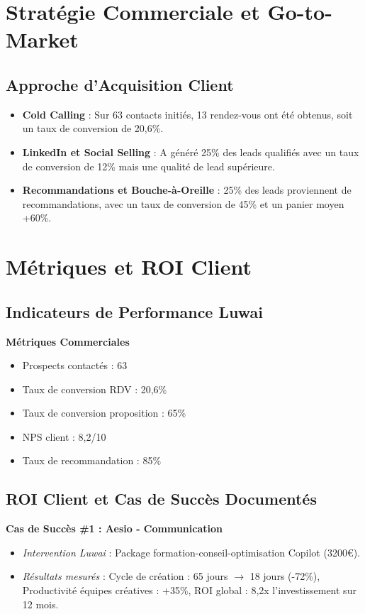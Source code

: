 \section{Stratégie Commerciale et Go-to-Market}

\subsection{Approche d'Acquisition Client}

\begin{itemize}
    \item \textbf{Cold Calling} : Sur 63 contacts initiés, 13 rendez-vous ont été obtenus, soit un taux de conversion de 20,6\%.
    \item \textbf{LinkedIn et Social Selling} : A généré 25\% des leads qualifiés avec un taux de conversion de 12\% mais une qualité de lead supérieure.
    \item \textbf{Recommandations et Bouche-à-Oreille} : 25\% des leads proviennent de recommandations, avec un taux de conversion de 45\% et un panier moyen +60\%.
\end{itemize}

\section{Métriques et ROI Client}

\subsection{Indicateurs de Performance Luwai}

\textbf{Métriques Commerciales}
\begin{itemize}
    \item Prospects contactés : 63
    \item Taux de conversion RDV : 20,6\%
    \item Taux de conversion proposition : 65\%
    \item NPS client : 8,2/10
    \item Taux de recommandation : 85\%
\end{itemize}

\subsection{ROI Client et Cas de Succès Documentés}

\textbf{Cas de Succès \#1 : Aesio - Communication}
\begin{itemize}
    \item \emph{Intervention Luwai} : Package formation-conseil-optimisation Copilot (3200€).
    \item \emph{Résultats mesurés} : Cycle de création : 65 jours $\rightarrow$ 18 jours (-72\%), Productivité équipes créatives : +35\%, ROI global : 8,2x l'investissement sur 12 mois.
\end{itemize}

